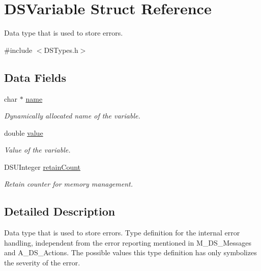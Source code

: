 \hypertarget{struct_d_s_variable}{
\section{DSVariable Struct Reference}
\label{struct_d_s_variable}
}


Data type that is used to store errors.  




{\ttfamily \#include $<$DSTypes.h$>$}

\subsection*{Data Fields}
\begin{DoxyCompactItemize}
\item 
\hypertarget{struct_d_s_variable_a5ac083a645d964373f022d03df4849c8}{
char $\ast$ \hyperlink{struct_d_s_variable_a5ac083a645d964373f022d03df4849c8}{name}}
\label{struct_d_s_variable_a5ac083a645d964373f022d03df4849c8}

\begin{DoxyCompactList}\small\item\em Dynamically allocated name of the variable. \item\end{DoxyCompactList}\item 
\hypertarget{struct_d_s_variable_aee90379adb0307effb138f4871edbc5c}{
double \hyperlink{struct_d_s_variable_aee90379adb0307effb138f4871edbc5c}{value}}
\label{struct_d_s_variable_aee90379adb0307effb138f4871edbc5c}

\begin{DoxyCompactList}\small\item\em Value of the variable. \item\end{DoxyCompactList}\item 
\hypertarget{struct_d_s_variable_ad5ce37afa302c9177c5543fb9cfaa191}{
DSUInteger \hyperlink{struct_d_s_variable_ad5ce37afa302c9177c5543fb9cfaa191}{retainCount}}
\label{struct_d_s_variable_ad5ce37afa302c9177c5543fb9cfaa191}

\begin{DoxyCompactList}\small\item\em Retain counter for memory management. \item\end{DoxyCompactList}\end{DoxyCompactItemize}


\subsection{Detailed Description}
Data type that is used to store errors. Type definition for the internal error handling, independent from the error reporting mentioned in M\_\-DS\_\-Messages and A\_\-DS\_\-Actions. The possible values this type definition has only symbolizes the severity of the error.


